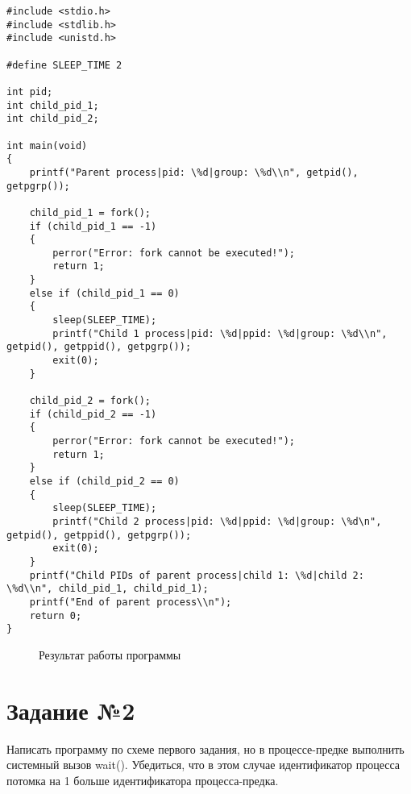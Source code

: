 \begin{lstlisting}[label=task_1,caption=Код к заданию №1]
#include <stdio.h>
#include <stdlib.h>
#include <unistd.h>

#define SLEEP_TIME 2

int pid;
int child_pid_1;
int child_pid_2;

int main(void)
{
    printf("Parent process|pid: \%d|group: \%d\\n", getpid(), getpgrp());

    child_pid_1 = fork();
    if (child_pid_1 == -1)
    {
        perror("Error: fork cannot be executed!");
        return 1;
    }
    else if (child_pid_1 == 0)
    {
        sleep(SLEEP_TIME);
        printf("Child 1 process|pid: \%d|ppid: \%d|group: \%d\\n", getpid(), getppid(), getpgrp());
        exit(0);
    }

    child_pid_2 = fork();
    if (child_pid_2 == -1)
    {
        perror("Error: fork cannot be executed!");
        return 1;
    }
    else if (child_pid_2 == 0)
    {
        sleep(SLEEP_TIME);
        printf("Child 2 process|pid: \%d|ppid: \%d|group: \%d\n", getpid(), getppid(), getpgrp());
        exit(0);
    }
    printf("Child PIDs of parent process|child 1: \%d|child 2: \%d\\n", child_pid_1, child_pid_1);
    printf("End of parent process\\n");
    return 0;
}
\end{lstlisting}

\begin{figure}[ph!]
	\caption{Результат работы программы}
\end{figure}

\section{Задание №2}
Написать программу по схеме первого задания, но в процессе-предке выполнить системный вызов wait(). Убедиться, что в этом случае идентификатор процесса потомка на 1 больше идентификатора процесса-предка.

